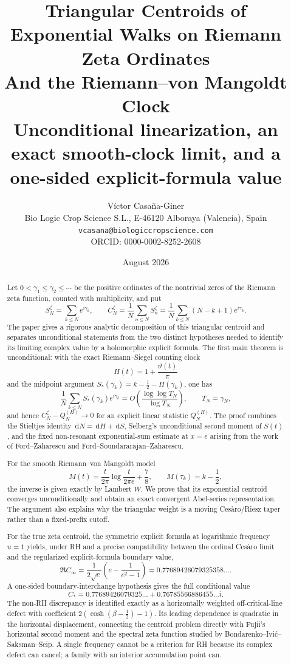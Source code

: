 \documentclass[11pt]{article}
\title{\textbf{Triangular Centroids of Exponential Walks on Riemann Zeta Ordinates\\
And the Riemann--von Mangoldt Clock}\\[0.4em]
\large Unconditional linearization, an exact smooth-clock limit, and a one-sided explicit-formula value}
\author{Víctor Casaña-Giner\\
\small Bio Logic Crop Science S.L., E-46120 Alboraya (Valencia), Spain\\
\small \texttt{vcasana@biologiccropscience.com}\\
\small ORCID: 0000-0002-8252-2608}
\date{August 2026}
\theoremstyle{definition}
\theoremstyle{remark}
\newcommand{\dd}{\,\mathrm d}
\begin{document}
\maketitle

\begin{abstract}
Let $0<\gamma_1\leq\gamma_2\leq\cdots$ be the positive ordinates of the nontrivial zeros of the Riemann zeta function, counted with multiplicity, and put
\[
S_N^{\zeta}=\sum_{k\leq N}e^{i\gamma_k},\qquad
C_N^{\zeta}=\frac1N\sum_{n\leq N}S_n^{\zeta}
=\frac1N\sum_{k\leq N}(N-k+1)e^{i\gamma_k}.
\]
The paper gives a rigorous analytic decomposition of this triangular centroid and separates unconditional statements from the two distinct hypotheses needed to identify its limiting complex value by a holomorphic explicit formula.  The first main theorem is unconditional: with the exact Riemann--Siegel counting clock
\[
H(t)=1+\frac{\vartheta(t)}{\pi}
\]
and the midpoint argument $S_*(\gamma_k)=k-\tfrac12-H(\gamma_k)$, one has
\[
\frac1N\sum_{k\leq N}S_*(\gamma_k)e^{i\gamma_k}
=O\!\left(\frac{\log\log T_N}{\log T_N}\right),\qquad T_N=\gamma_N,
\]
and hence $C_N^{\zeta}-Q_N^{(H)}\to0$ for an explicit linear statistic $Q_N^{(H)}$.  The proof combines the Stieltjes identity $\dd N=\dd H+\dd S$, Selberg's unconditional second moment of $S(t)$, and the fixed non-resonant exponential-sum estimate at $x=e$ arising from the work of Ford--Zaharescu and Ford--Soundararajan--Zaharescu.

For the smooth Riemann--von Mangoldt model
\[
M(t)=\frac{t}{2\pi}\log\frac{t}{2\pi e}+\frac78,
\qquad M(\tau_k)=k-\frac12,
\]
the inverse is given exactly by Lambert $W$.  We prove that its exponential centroid converges unconditionally and obtain an exact convergent Abel-series representation.  The argument also explains why the triangular weight is a moving Cesàro/Riesz taper rather than a fixed-prefix cutoff.

For the true zeta centroid, the symmetric explicit formula at logarithmic frequency $u=1$ yields, under RH and a precise compatibility between the ordinal Cesàro limit and the regularized explicit-formula boundary value,
\[
\Re C_\infty=
\frac{1}{2\sqrt e}\left(e-\frac1{e^2-1}\right)
=0.77689426079325358\ldots.
\]
A one-sided boundary-interchange hypothesis gives the full conditional value
\[
C_*=0.77689426079325\ldots+0.76785566886455\ldots i.
\]
The non-RH discrepancy is identified exactly as a horizontally weighted off-critical-line defect with coefficient $2(\cosh(\beta-\tfrac12)-1)$.  Its leading dependence is quadratic in the horizontal displacement, connecting the centroid problem directly with Fujii's horizontal second moment and the spectral zeta function studied by Bondarenko--Ivić--Saksman--Seip.  A single frequency cannot be a criterion for RH because its complex defect can cancel; a family with an interior accumulation point can.
\end{abstract}
\end{document}
